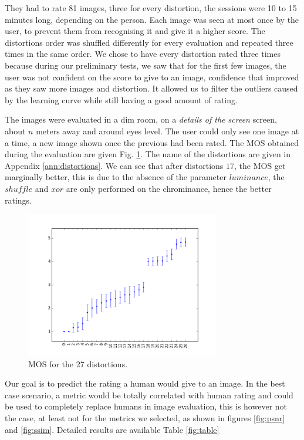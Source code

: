 \documentclass{article}
\begin{document}
They had to rate 81 images, three for every distortion, the sessions were 10 to 15 minutes long, depending on the person. Each image was seen at most once by the user, to prevent them from recognising it and give it a higher score. The distortions order was shuffled differently for every evaluation and repeated three times in the same order. We chose to have every distortion rated three times because during our preliminary tests, we saw that for the first few images, the user was not confident on the score to give to an image, confidence that improved as they saw more images and distortion. It allowed us to filter the outliers caused by the learning curve while still having a good amount of rating.

The images were evaluated in a dim room, on a \textit{details of the screen} screen, about $n$ meters away and around eyes level. The user could only see one image at a time, a new image shown once the previous had been rated.
The MOS obtained during the evaluation are given Fig. \ref{fig:mos}. The name of the distortions are given in Appendix \ref{ann:distortions}. We can see that after distortions $17$, the MOS get marginally better, this is due to the absence of the parameter $luminance$, the $shuffle$ and $xor$ are only performed on the chrominance, hence the better ratings.

\begin{figure}[ht]
  \centering
  \includegraphics[width=8.5cm]{figures/mos}
  \vspace{-5mm}
  \caption{MOS for the 27 distortions.\label{fig:mos} }
\end{figure}

Our goal is to predict the rating a human would give to an image. In the best case scenario, a metric would be totally correlated with human rating and could be used to completely replace humans in image evaluation, this is however not the case, at least not for the metrics we selected, as shown in figures \ref{fig:psnr} and \ref{fig:ssim}. Detailed results are available Table \ref{fig:table}
\end{document}
